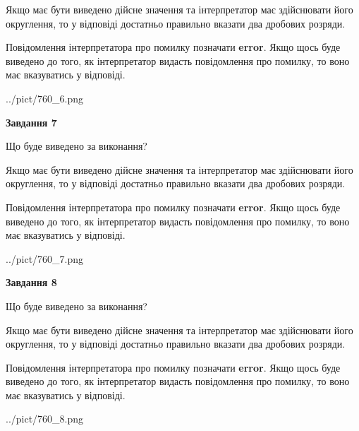 \documentclass[12pt, ukrainian]{article}
\begin{document}
{\begin {Large}
Якщо має бути виведено дійсне значення та інтерпретатор має здійснювати його округлення, 
то у відповіді достатньо правильно вказати два дробових розряди.

Повідомлення інтерпретатора про помилку позначати \textbf{error}.
Якщо щось буде виведено до того, як інтерпретатор видасть повідомлення про помилку, 
то воно має вказуватись у відповіді. \par

\begin{center}
	{../pict/760_6.png}
\end{center}
\newpage

{\begin {center}\textbf{Завдання 7}\end {center}}\par
Що буде виведено за виконання? \par

Якщо має бути виведено дійсне значення та інтерпретатор має здійснювати його округлення, 
то у відповіді достатньо правильно вказати два дробових розряди.

Повідомлення інтерпретатора про помилку позначати \textbf{error}.
Якщо щось буде виведено до того, як інтерпретатор видасть повідомлення про помилку, 
то воно має вказуватись у відповіді. \par

\begin{center}
	{../pict/760_7.png}
\end{center}
\newpage

{\begin {center}\textbf{Завдання 8}\end {center}}\par
Що буде виведено за виконання? \par

Якщо має бути виведено дійсне значення та інтерпретатор має здійснювати його округлення, 
то у відповіді достатньо правильно вказати два дробових розряди.

Повідомлення інтерпретатора про помилку позначати \textbf{error}.
Якщо щось буде виведено до того, як інтерпретатор видасть повідомлення про помилку, 
то воно має вказуватись у відповіді. \par

\begin{center}
	{../pict/760_8.png}
\end{center}
\newpage


\end{Large}}
\end{document}
